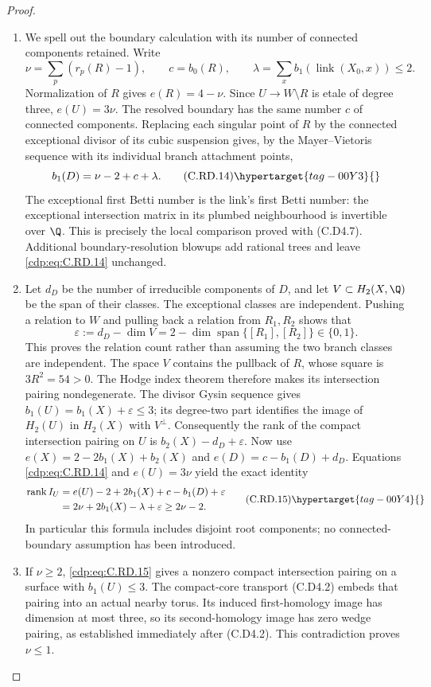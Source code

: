 \begin{proof}
\begin{enumerate}[label={$\langle1\rangle$\arabic*.},leftmargin=*]
\item We spell out the boundary calculation with its number
of connected components retained. Write
\[
 \nu=\sum_p(r_p(R)-1),\qquad
 c=b_0(R),\qquad
 \lambda=\sum_x b_1(\operatorname{link}(X_0,x))\le2.
\]
Normalization of $R$ gives $e(R)=4-\nu$.
Since $U\to W\setminus R$ is etale of degree three,
$e(U)=3\nu$. The resolved boundary has the same
number $c$ of connected components. Replacing each
singular point of $R$ by the connected exceptional
divisor of its cubic suspension gives, by the
Mayer--Vietoris sequence with its individual branch
attachment points,
\[
                 b_1(D)=\nu-2+c+\lambda.
\tag{C.RD.14}\hypertarget{tag-00Y3}{}\label{cdp:eq:C.RD.14}
\]
The exceptional first Betti number is the link's
first Betti number: the exceptional intersection
matrix in its plumbed neighbourhood is invertible
over $\Q$. This is precisely the local comparison
proved with (C.D4.7). Additional boundary-resolution
blowups add rational trees and leave \eqref{cdp:eq:C.RD.14}
unchanged.

\item Let $d_D$ be the number of irreducible components
of $D$, and let $V\subset H_2(X,\Q)$ be the span
of their classes. The exceptional classes are
independent. Pushing a relation to $W$ and pulling
back a relation from $R_1,R_2$ shows that
\[
 \varepsilon:=d_D-\dim V
      =2-\dim\operatorname{span}\{[R_1],[R_2]\}
      \in\{0,1\}.
\]
This proves the relation count rather than
assuming the two branch classes are independent.
The space $V$ contains the pullback of $R$,
whose square is $3R^2=54>0$. The Hodge index
theorem therefore makes its intersection pairing
nondegenerate. The divisor Gysin sequence gives
$b_1(U)=b_1(X)+\varepsilon\le3$; its degree-two
part identifies the image of $H_2(U)$ in
$H_2(X)$ with $V^\perp$. Consequently the rank
of the compact intersection pairing on $U$ is
$b_2(X)-d_D+\varepsilon$.
Now use $e(X)=2-2b_1(X)+b_2(X)$ and
$e(D)=c-b_1(D)+d_D$. Equations \eqref{cdp:eq:C.RD.14} and
$e(U)=3\nu$ yield the exact identity
\[
\begin{split}
 \operatorname{rank}I_U
   &=e(U)-2+2b_1(X)+c-b_1(D)+\varepsilon\\
   &=2\nu+2b_1(X)-\lambda+\varepsilon
     \ge2\nu-2.
\end{split}
\tag{C.RD.15}\hypertarget{tag-00Y4}{}\label{cdp:eq:C.RD.15}
\]
In particular this formula includes disjoint root
components; no connected-boundary assumption has
been introduced.

\item If $\nu\ge2$, \eqref{cdp:eq:C.RD.15} gives a nonzero compact
intersection pairing on a surface with $b_1(U)\le3$.
The compact-core transport (C.D4.2) embeds that
pairing into an actual nearby torus. Its induced
first-homology image has dimension at most three,
so its second-homology image has zero wedge pairing,
as established immediately after (C.D4.2). This
contradiction proves $\nu\le1$.


\end{enumerate}
\end{proof}

